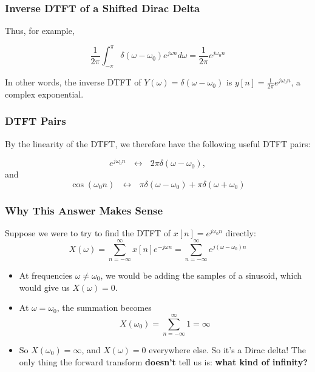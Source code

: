 \documentclass{beamer}
\begin{document}
\begin{frame}
  \frametitle{Inverse DTFT of a Shifted Dirac Delta}

  Thus, for example,

  \begin{displaymath}
    \frac{1}{2\pi}\int_{-\pi}^\pi \delta(\omega-\omega_0) e^{j\omega n}d\omega =
    \frac{1}{2\pi}e^{j\omega_0 n}
  \end{displaymath}

  In other words, the inverse DTFT of $Y(\omega)=\delta(\omega-\omega_0)$ is
  $y[n]= \frac{1}{2\pi}e^{j\omega_0 n}$, a complex exponential.
\end{frame}

\begin{frame}
  \frametitle{DTFT Pairs}

  By the linearity of the DTFT, we therefore have the following useful
  DTFT pairs:

  \begin{displaymath}
    e^{j\omega_0 n} ~~~\leftrightarrow ~~~ 2\pi\delta(\omega-\omega_0),
  \end{displaymath}
  and
  \begin{displaymath}
    \cos(\omega_0 n) ~~~\leftrightarrow ~~~ \pi\delta(\omega-\omega_0)+\pi\delta(\omega+\omega_0)
  \end{displaymath}
\end{frame}

\begin{frame}
  \frametitle{Why This Answer Makes Sense}

  Suppose we were to try to find the DTFT of $x[n]=e^{j\omega_0 n}$ directly:
  \begin{displaymath}
    X(\omega) = \sum_{n=-\infty}^\infty x[n]e^{-j\omega n} = \sum_{n=-\infty}^\infty e^{j(\omega-\omega_0)n}
  \end{displaymath}
  \begin{itemize}
  \item At frequencies $\omega\ne\omega_0$, we would be adding the
    samples of a sinusoid, which would give us $X(\omega)=0$.
  \item At $\omega=\omega_0$, the summation becomes
    \begin{displaymath}
      X(\omega_0) = \sum_{n=-\infty}^\infty 1 = \infty
    \end{displaymath}
  \item So $X(\omega_0)=\infty$, and $X(\omega)=0$ everywhere else.
    So it's a Dirac delta!  The only thing the forward transform {\bf
      doesn't} tell us is: {\bf what kind of infinity?}
  \end{itemize}
\end{frame}
\end{document}

